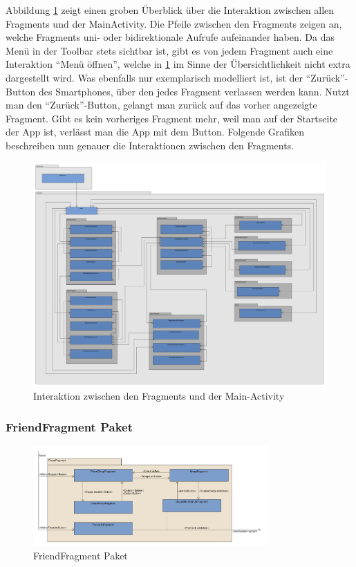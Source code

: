 Abbildung \ref{viewinteract} zeigt einen groben Überblick über die Interaktion zwischen allen Fragments und der MainActivity. Die Pfeile zwischen den Fragments zeigen an, welche Fragments uni- oder bidirektionale Aufrufe aufeinander haben. Da das Menü in der Toolbar stets sichtbar ist, gibt es von jedem Fragment auch eine Interaktion "`Menü öffnen"', welche in \ref{viewinteract} im Sinne der Übersichtlichkeit nicht extra dargestellt wird. 
Was ebenfalls nur exemplarisch modelliert ist, ist der "`Zurück"'-Button des Smartphones, über den jedes Fragment verlassen werden kann. Nutzt man den "`Zurück"'-Button, gelangt man zurück auf das vorher angezeigte Fragment. Gibt es kein vorheriges Fragment mehr, weil man auf der Startseite der App ist, verlässt man die App mit dem Button.
Folgende Grafiken beschreiben nun genauer die Interaktionen zwischen den Fragments.

\begin{figure}[H]
	\centering
	\includegraphics[width=1\textwidth]{pics/viewPackages/ViewPaketmodel_Interaktion.pdf}%
	\caption{Interaktion zwischen den Fragments und der Main-Activity}%
	\label{viewinteract}%
\end{figure}

\subsubsection{FriendFragment Paket}
\begin{figure}[H]
	\centering
	\includegraphics[width=0.8\textwidth]{pics/viewPackages/FriendFragmentPaket.pdf}%
	\caption{FriendFragment Paket}%
	\label{view}%
\end{figure}


